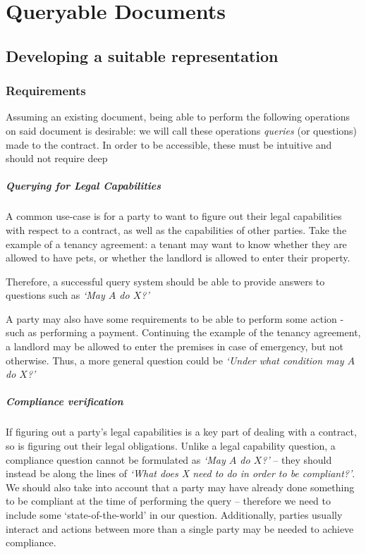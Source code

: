 \chapter{Queryable Documents}\label{ch:queries}


\section{Developing a suitable representation}\label{sec:queries-representation}

\subsection{Requirements}\label{subsec:queries-requirements}

Assuming an existing document, being able to perform the following operations on said document is desirable: we will call these operations \emph{queries} (or questions) made to the contract.
In order to be accessible, these must be intuitive and should not require deep


\paragraph{Querying for Legal Capabilities} A common use-case is for a party to want to figure out their legal capabilities with respect to a contract, as well as the capabilities of other parties.
Take the example of a tenancy agreement: a tenant may want to know whether they are allowed to have pets, or whether the landlord is allowed to enter their property.

Therefore, a successful query system should be able to provide answers to questions such as \textit{`May $A$ do $X$?'}

A party may also have some requirements to be able to perform some action - such as performing a payment.
Continuing the example of the tenancy agreement, a landlord may be allowed to enter the premises in case of emergency, but not otherwise.
Thus, a more general question could be \emph{`Under what condition may $A$ do $X$?'}

\paragraph{Compliance verification} If figuring out a party's legal capabilities is a key part of dealing with a contract, so is figuring out their legal obligations.
Unlike a legal capability question, a compliance question cannot be formulated as \textit{`May $A$ do $X$?'} -- they should instead be along the lines of \textit{`What does X need to do in order to be compliant?'}.
We should also take into account that a party may have already done something to be compliant at the time of performing the query -- therefore we need to include some `state-of-the-world' in our question.
Additionally, parties usually interact and actions between more than a single party may be needed to achieve compliance.

